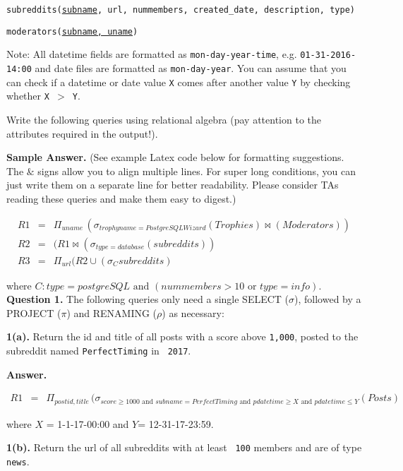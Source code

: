 \documentclass[11pt]{article}
\begin{document}
\hspace*{0.1in} {\tt subreddits(\underline{subname}, url, nummembers, created\_date, description, type)}

\hspace*{0.1in} {\tt moderators(\underline{subname, uname})}


  Note: All datetime fields are formatted as \verb+mon-day-year-time+,
  e.g. \verb+01-31-2016-14:00+ and date files are formatted as
  \verb+mon-day-year+. You can assume that you can check if a datetime
  or date value {\tt X} comes after another value {\tt Y} by checking
  whether {\tt X $>$ Y}.


  Write the following queries using relational algebra (pay attention
  to the attributes required in the output!).

{\bf Sample Answer.} (See example Latex code below for formatting
suggestions. The $\&$ signs allow you to align multiple lines. For
super long conditions, you can just write them on a separate line for
better readability. Please consider TAs reading these queries and make
them easy to digest.)

\begin{eqnarray*}
  R1 & = & \Pi_{uname} \, (\sigma_{trophyname=PostgreSQLWizard} (Trophies) \bowtie (Moderators)) \\
  R2 & = & (R1 \bowtie (\sigma_{type = database} (subreddits)) \\
  R3 & = & \Pi_{url} (R2 \cup (\sigma_{C} subreddits) 
  \end{eqnarray*}
  
where $C: type=postgreSQL \mbox{ and }  (nummembers > 10 \mbox{ or }  type =info)$.
\newpage 
{\bf Question 1.} The following queries only need a single SELECT
($\sigma$), followed by a PROJECT ($\pi$) and RENAMING
($\rho$) as necessary:

{\bf 1(a).} Return the id and title of all posts with a score above
{\tt 1,000}, posted to the subreddit named {\tt PerfectTiming} in {\tt
  2017}.

{\bf Answer.} 

\begin{eqnarray*}
  R1 & = & \Pi_{postid, title} \, (\sigma_{score \geq 1000 \mbox{ and } subname = PerfectTiming \mbox{ and }
pdatetime \geq X \mbox { and } pdatetime \leq Y} (Posts) 
  \end{eqnarray*}

where $X$ = 1-1-17-00:00 and $Y$= 12-31-17-23:59.

{\bf 1(b).} Return the url of all subreddits with at least {\tt
  100} members and are of type {\tt news}.
\end{document}
